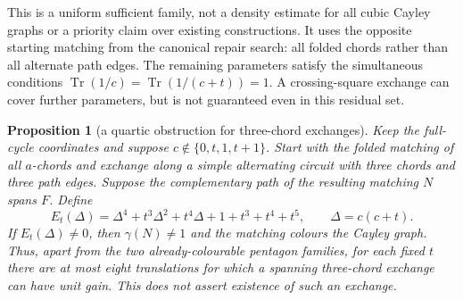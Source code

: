 \documentclass[11pt,a4paper]{article}
\newtheorem{proposition}[theorem]{Proposition}
\theoremstyle{definition}
\theoremstyle{remark}
\begin{document}
This is a uniform sufficient family, not a density estimate for all cubic Cayley graphs or a priority claim over existing constructions.  It uses the opposite starting matching from the canonical repair search: all folded chords rather than all alternate path edges.  The remaining parameters satisfy the simultaneous conditions $\operatorname{Tr}(1/c)=\operatorname{Tr}(1/(c+t))=1$.  A crossing-square exchange can cover further parameters, but is not guaranteed even in this residual set.

\begin{proposition}[a quartic obstruction for three-chord exchanges]\label{prop:borel-three-quartic}
Keep the full-cycle coordinates and suppose $c\notin\{0,t,1,t+1\}$.  Start with the folded matching of all $a$-chords and exchange along a simple alternating circuit with three chords and three path edges.  Suppose the complementary path of the resulting matching $N$ spans $F$.  Define
\[
 E_t(\Delta)=\Delta^4+t^3\Delta^2+t^4\Delta+1+t^3+t^4+t^5,
 \qquad \Delta=c(c+t).
\]
If $E_t(\Delta)\ne0$, then $\gamma(N)\ne1$ and the matching colours the Cayley graph.  Thus, apart from the two already-colourable pentagon families, for each fixed $t$ there are at most eight translations for which a spanning three-chord exchange can have unit gain.  This does not assert existence of such an exchange.
\end{proposition}
\end{document}
